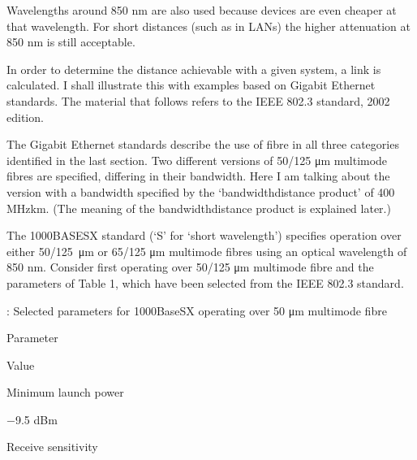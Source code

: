 \documentclass[letterpaper,10pt,english]{sphinxmanual}
\begin{document}
Wavelengths around 850 nm are also used because devices are even cheaper at that wavelength. For short distances (such as in LANs) the higher attenuation at 850 nm is still acceptable.

In order to determine the distance achievable with a given system, a link  is calculated. I shall illustrate this with examples based on Gigabit Ethernet standards. The material that follows refers to the IEEE 802.3 standard, 2002 edition.

The Gigabit Ethernet standards describe the use of fibre in all three categories identified in the last section. Two different versions of 50/125 μm multimode fibres are specified, differing in their bandwidth. Here I am talking about the version with a bandwidth specified by the ‘bandwidth\sphinxhyphen{}distance product’ of 400 MHz\sphinxhyphen{}km. (The meaning of the bandwidth\sphinxhyphen{}distance product is explained later.)

The 1000BASE\sphinxhyphen{}SX standard (‘S’ for ‘short wavelength’) specifies operation over either 50/125 μm or 65/125 μm multimode fibres using an optical wavelength of 850 nm. Consider first operating over 50/125 μm multimode fibre and the parameters of Table 1, which have been selected from the IEEE 802.3 standard.





: Selected parameters for 1000Base\sphinxhyphen{}SX operating over 50 μm multimode fibre









Parameter





Value









Minimum launch power





−9.5 dBm









Receive sensitivity
\end{document}
